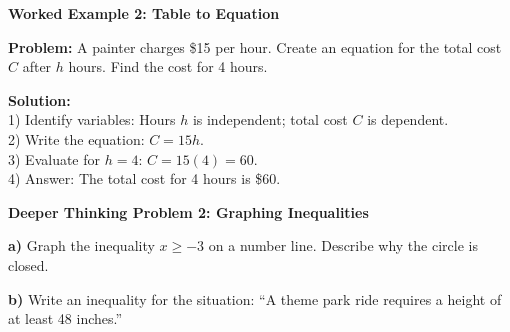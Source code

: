 \documentclass[12pt, letterpaper, fleqn]{article}
\begin{document}
\begin{tcolorbox}[colback=white, colframe=black!25, boxrule=0.6pt, arc=4mm, left=6mm, right=6mm, top=5mm, bottom=5mm]
\textbf{Worked Example 2: Table to Equation}

\medskip
\noindent
\textbf{Problem:} A painter charges \$15 per hour. Create an equation for the total cost $C$ after $h$ hours. Find the cost for 4 hours.

\medskip
\noindent
\textbf{Solution:} \\
1) Identify variables: Hours $h$ is independent; total cost $C$ is dependent. \\
2) Write the equation: $C = 15h$. \\
3) Evaluate for $h = 4$: $C = 15(4) = 60$. \\
4) Answer: The total cost for 4 hours is \$60.
\end{tcolorbox}

\vspace{2mm}

\begin{tcolorbox}[colback=white, colframe=black, boxrule=1pt, arc=4mm, left=6mm, right=6mm, top=5mm, bottom=5mm]
\textbf{Deeper Thinking Problem 2: Graphing Inequalities}

\medskip

\noindent
\textbf{a)} Graph the inequality $x \ge -3$ on a number line. Describe why the circle is closed.

\vspace{2.5cm}

\noindent
\textbf{b)} Write an inequality for the situation: ``A theme park ride requires a height of at least 48 inches.''

\vspace{2cm}
\end{tcolorbox}
\newpage
\end{document}
